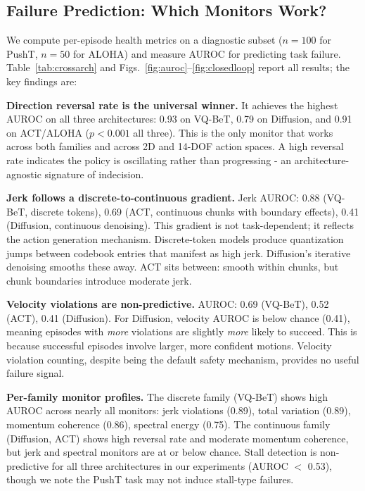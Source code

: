 \documentclass[conference]{IEEEtran}
\begin{document}
\subsection{Failure Prediction: Which Monitors Work?}
\label{sec:failure_prediction}

We compute per-episode health metrics on a diagnostic subset ($n{=}100$ for PushT, $n{=}50$ for ALOHA) and measure AUROC for predicting task failure.
Table~\ref{tab:crossarch} and Figs.~\ref{fig:auroc}--\ref{fig:closedloop} report all results; the key findings are:

\textbf{Direction reversal rate is the universal winner.}
It achieves the highest AUROC on all three architectures: 0.93 on VQ-BeT, 0.79 on Diffusion, and 0.91 on ACT/ALOHA ($p < 0.001$ all three).
This is the only monitor that works across both families and across 2D and 14-DOF action spaces.
A high reversal rate indicates the policy is oscillating rather than progressing - an architecture-agnostic signature of indecision.

\textbf{Jerk follows a discrete-to-continuous gradient.}
Jerk AUROC: 0.88 (VQ-BeT, discrete tokens), 0.69 (ACT, continuous chunks with boundary effects), 0.41 (Diffusion, continuous denoising).
This gradient is not task-dependent; it reflects the action generation mechanism.
Discrete-token models produce quantization jumps between codebook entries that manifest as high jerk.
Diffusion's iterative denoising smooths these away.
ACT sits between: smooth within chunks, but chunk boundaries introduce moderate jerk.

\textbf{Velocity violations are non-predictive.}
AUROC: 0.69 (VQ-BeT), 0.52 (ACT), 0.41 (Diffusion).
For Diffusion, velocity AUROC is below chance (0.41), meaning episodes with \emph{more} violations are slightly \emph{more} likely to succeed.
This is because successful episodes involve larger, more confident motions.
Velocity violation counting, despite being the default safety mechanism, provides no useful failure signal.

\textbf{Per-family monitor profiles.}
The discrete family (VQ-BeT) shows high AUROC across nearly all monitors: jerk violations (0.89), total variation (0.89), momentum coherence (0.86), spectral energy (0.75).
The continuous family (Diffusion, ACT) shows high reversal rate and moderate momentum coherence, but jerk and spectral monitors are at or below chance.
Stall detection is non-predictive for all three architectures in our experiments (AUROC $<$ 0.53), though we note the PushT task may not induce stall-type failures.
\end{document}
